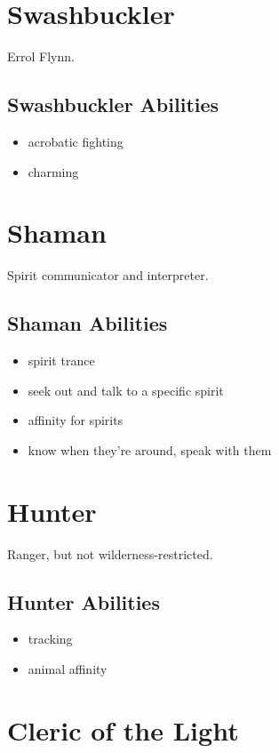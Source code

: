 \begin{multicols}{2}
\section{Swashbuckler}

Errol Flynn.

\subsection{Swashbuckler Abilities}

\begin{itemize}
    \item acrobatic fighting
    \item charming
\end{itemize}

\section{Shaman}

Spirit communicator and interpreter.

\subsection{Shaman Abilities}

\begin{itemize}
    \item spirit trance   \item seek out and talk to a specific spirit
    \item affinity for spirits    \item know when they're around, speak with them
\end{itemize}

\section{Hunter}

Ranger, but not wilderness-restricted.

\subsection{Hunter Abilities}

\begin{itemize}
    \item tracking
    \item animal affinity
\end{itemize}

\section{Cleric of the Light}


\end{multicols}
